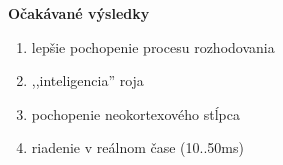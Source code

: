\documentclass[xcolor=dvipsnames]{beamer}
\begin{document}
\begin{frame}{\bf Očakávané výsledky}

		\begin{enumerate}
            \item lepšie pochopenie procesu rozhodovania
            \item ,,inteligencia'' roja
            \item pochopenie neokortexového stĺpca
            \item riadenie v reálnom čase (10..50ms)
		\end{enumerate}

\end{frame}


\end{document}
